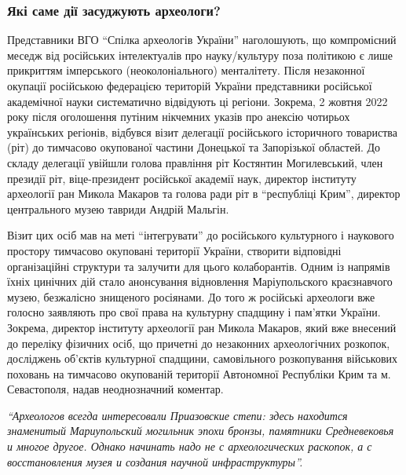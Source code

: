 
\subsubsection{Які саме дії засуджують археологи?}

Представники ВГО \enquote{Спілка археологів України} наголошують, що компромісний
меседж від російських інтелектуалів про науку/культуру поза політикою є лише
прикриттям імперського (неоколоніального) менталітету. Після незаконної
окупації російською федерацією територій України представники російської
академічної науки систематично відвідують ці регіони. Зокрема, 2 жовтня 2022
року після оголошення путіним нікчемних указів про анексію чотирьох українських
регіонів, відбувся візит делегації російського історичного товариства (ріт) до
тимчасово окупованої частини Донецької та Запорізької областей. До складу
делегації увійшли голова правління ріт Костянтин Могилевський, член президії
ріт, віце-президент російської академії наук, директор інституту археології ран
Микола Макаров та голова ради ріт в \enquote{республіці Крим}, директор центрального
музею тавриди Андрій Мальгін.



Візит цих осіб мав на меті \enquote{інтегрувати} до російського культурного і наукового
простору тимчасово окуповані території України, створити відповідні
організаційні структури та залучити для цього колаборантів. Одним із напрямів
їхніх цинічних дій стало анонсування відновлення Маріупольского краєзнавчого
музею, безжалісно знищеного росіянами. До того ж російські археологи вже
голосно заявляють про свої права на культурну спадщину і пам'ятки України.
Зокрема, директор інституту археології ран Микола Макаров, який вже внесений до
переліку фізичних осіб, що причетні до незаконних археологічних розкопок,
досліджень об'єктів культурної спадщини, самовільного розкопування військових
поховань на тимчасово окупованій території Автономної Республіки Крим та м.
Севастополя, надав неоднозначний коментар.

\begin{leftbar}
\em\enquote{Археологов всегда интересовали Приазовские степи: здесь находится знаменитый
Мариупольский могильник эпохи бронзы, памятники Средневековья и многое другое.
Однако начинать надо не с археологических раскопок, а с восстановления музея и
создания научной инфраструктуры}. 
\end{leftbar}


